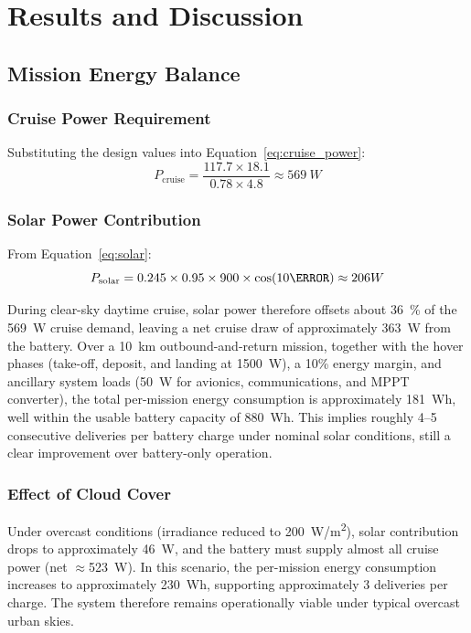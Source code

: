 \documentclass[conference]{IEEEtran}
\begin{document}
\section{Results and Discussion}
\label{sec:results}

\subsection{Mission Energy Balance}

\subsubsection{Cruise Power Requirement}

Substituting the design values into Equation~\ref{eq:cruise_power}:
\[
P_{\text{cruise}} = \frac{117.7 \times 18.1}{0.78 \times 4.8} \approx \SI{569}{W}
\]

\subsubsection{Solar Power Contribution}

From Equation~\ref{eq:solar}:
$$P_{\text{solar}} = 0.245 \times 0.95 \times 900 \times \cos(10\degree) \approx 206{W}$$

During clear-sky daytime cruise, solar power therefore offsets about \SI{36}{\%} of the \SI{569}{W} cruise demand, leaving a net cruise draw of approximately \SI{363}{W} from the battery. Over a \SI{10}{km} outbound-and-return mission, together with the hover phases (take-off, deposit, and landing at \SI{1500}{W}), a 10\% energy margin, and ancillary system loads (\SI{50}{W} for avionics, communications, and MPPT converter), the total per-mission energy consumption is approximately \SI{181}{Wh}, well within the usable battery capacity of \SI{880}{Wh}. This implies roughly 4--5 consecutive deliveries per battery charge under nominal solar conditions, still a clear improvement over battery-only operation.

\subsubsection{Effect of Cloud Cover}

Under overcast conditions (irradiance reduced to \SI{200}{W/m^2}),
solar contribution drops to approximately \SI{46}{W},
and the battery must supply almost all cruise power (net \(\approx\)\SI{523}{W}).
In this scenario, the per-mission energy consumption increases to approximately
\SI{230}{Wh}, supporting approximately 3 deliveries per charge.
The system therefore remains operationally viable under typical overcast urban skies.
\end{document}
